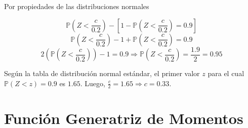 \documentclass[11pt, spanish]{article}
\begin{document}
\begin{enumerate}[(a)]
\pagebreak
Por propiedades de las distribuciones normales

$$  \mathbb{P}\left(Z < \frac{c}{0.2} \right) - \left[ 1 - \mathbb{P}\left(Z < \frac{c}{0.2} \right) = 0.9 \right] $$
$$  \mathbb{P}\left(Z < \frac{c}{0.2} \right) - 1 + \mathbb{P}\left(Z < \frac{c}{0.2} \right) = 0.9 $$
$$  2\left(\mathbb{P}\left(Z < \frac{c}{0.2} \right)\right) - 1  = 0.9 \Rightarrow \mathbb{P}\left(Z < \frac{c}{0.2} \right) = \frac{1.9}{2} = 0.95$$

Según la tabla de distribución normal estándar, el primer valor $z$ para el cual $\mathbb{P}\left(Z < z \right) = 0.9$ es $1.65$. Luego, $\frac{c}{2} = 1.65 \Rightarrow c = 0.33$.



\end{enumerate}

\pagebreak
\section{Función Generatriz de Momentos}
\end{document}

